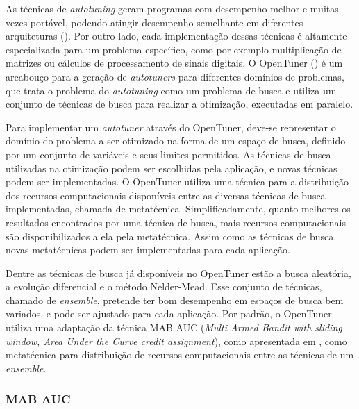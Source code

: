 \documentclass[a4paper, 11pt]{article}
\begin{document}
As técnicas de \emph{autotuning} geram programas com desempenho melhor e 
muitas vezes portável, podendo atingir desempenho semelhante em diferentes 
arquiteturas (\citet{demmel2009accelerating}). Por outro lado, cada 
implementação dessas técnicas é altamente especializada para um problema 
específico, como por exemplo multiplicação de matrizes ou cálculos de 
processamento de sinais digitais.
O OpenTuner (\citet{ansel2013opentuner}) é um arcabouço para a geração de 
\emph{autotuners} para diferentes domínios de problemas, que trata o problema
do \emph{autotuning} como um problema de busca e utiliza um conjunto de 
técnicas de busca para realizar a otimização, executadas em paralelo.

Para implementar um \emph{autotuner} através do OpenTuner, deve-se representar
o domínio do problema a ser otimizado na forma de um espaço de busca, definido 
por um conjunto de variáveis e seus limites permitidos. As técnicas de busca 
utilizadas na otimização podem ser escolhidas pela aplicação, e novas técnicas
podem ser implementadas. O OpenTuner utiliza uma técnica para a 
distribuição dos recursos computacionais disponíveis entre as 
diversas técnicas de busca implementadas, chamada de metatécnica.
Simplificadamente, quanto melhores os resultados encontrados por uma técnica de
busca, mais recursos computacionais são disponibilizados a ela pela 
metatécnica. Assim como as técnicas de busca, novas metatécnicas podem ser 
implementadas para cada aplicação.

Dentre as técnicas de busca já disponíveis no OpenTuner estão a busca 
aleatória, a evolução diferencial e o método Nelder-Mead. Esse conjunto
de técnicas, chamado de \emph{ensemble}, pretende ter bom desempenho em espaços
de busca bem variados, e pode ser ajustado para cada aplicação. Por padrão, o 
OpenTuner utiliza uma adaptação da técnica MAB AUC (\emph{Multi Armed Bandit 
with sliding window, Area Under the Curve credit assignment}), como apresentada
em \citet{pacula2012bandit}, como metatécnica para distribuição de recursos 
computacionais entre as técnicas de um \emph{ensemble}.

\subsubsection{MAB AUC}
\end{document}
